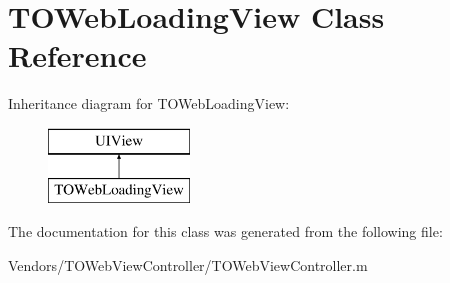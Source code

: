 \hypertarget{interface_t_o_web_loading_view}{}\section{T\+O\+Web\+Loading\+View Class Reference}
\label{interface_t_o_web_loading_view}
Inheritance diagram for T\+O\+Web\+Loading\+View\+:\begin{figure}[H]
\begin{center}
\leavevmode
\includegraphics[height=2.000000cm]{interface_t_o_web_loading_view}
\end{center}
\end{figure}


The documentation for this class was generated from the following file\+:\begin{DoxyCompactItemize}
\item 
Vendors/\+T\+O\+Web\+View\+Controller/T\+O\+Web\+View\+Controller.\+m\end{DoxyCompactItemize}
